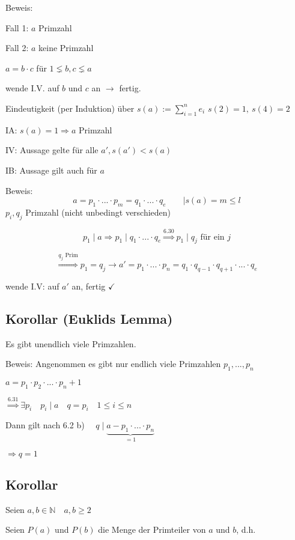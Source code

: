 \documentclass[a4paper, 12pt, twoside] {article}
\begin{document}
Beweis:

\qquad	Fall 1: $a$ Primzahl \checkmark
	
\qquad	Fall 2: $a$ keine Primzahl
	
\qquad	$a=b \cdot c$ für $1 \lneq b, c \lneq a$
	
\qquad	wende I.V. auf $b$ und $c$ an $\rightarrow$ fertig.
	
Eindeutigkeit (per Induktion) über $s(a) := \sum_{i=1}^{n} e_i$ \hfill $s(2) = 1, \ s(4) = 2$

IA:		$s(a) = 1 \Rightarrow a$ Primzahl \checkmark

IV:		Aussage gelte für alle $a', s(a') < s(a)$

IB:		Aussage gilt auch für $a$

Beweis:
$$a = p_1 \cdot ... \cdot p_m = q_1 \cdot ... \cdot q_e \qquad | s(a) = m \leq l$$
\hfill $p_i, q_j$ Primzahl (nicht unbedingt verschieden)

$$p_1 \mid a \Rightarrow p_1 \mid q_1 \cdot ... \cdot q_e \overset{6.30}{\Rightarrow} p_1 \mid q_j \text{ für ein } j$$

$$\overset{q_j \text{ Prim}}{\Rightarrow} p_1 = q_j \rightarrow a' = p_1 \cdot ... \cdot p_n = q_1 \cdot q_{q-1} \cdot q_{q+1} \cdot ... \cdot q_e$$

\qquad \qquad wende I.V: auf $a'$ an, fertig \hfill $\checkmark$

\subsection{Korollar (Euklids Lemma)} %

Es gibt unendlich viele Primzahlen.

Beweis: Angenommen es gibt nur endlich viele Primzahlen $p_1, ..., p_n$

$a = p_1 \cdot p_2 \cdot ... \cdot p_n + 1$

$\overset{6.31}{\Rightarrow} \exists p_i \quad p_i \mid a \quad q = p_i \quad 1 \leq i \leq n$
	
Dann gilt nach 6.2 b) $\quad q \mid \underbrace{a - p_1 \cdot ... \cdot p_n}_{=1}$

$\Rightarrow q = 1$ \Lightning

\subsection{Korollar} %

Seien $a,b \in \mathbb{N} \quad a,b \geq 2$

Seien $P(a)$ und $P(b)$ die Menge der Primteiler von $a$ und $b$, d.h.
\end{document}
